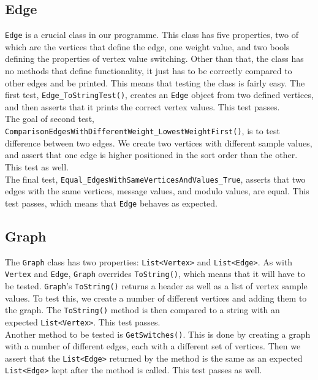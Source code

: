 \subsection*{Edge}
\lstinline|Edge| is a crucial class in our programme.
This class has five properties, two of which are the vertices that define the edge, one weight value, and two bools defining the properties of vertex value switching.
Other than that, the class has no methods that define functionality, it just has to be correctly compared to other edges and be printed.
This means that testing the class is fairly easy.
The first test, \lstinline|Edge_ToStringTest()|, creates an \lstinline|Edge| object from two defined vertices, and then asserts that it prints the correct vertex values.
This test passes.\\
The goal of second test, \lstinline|ComparisonEdgesWithDifferentWeight_LowestWeightFirst()|, is to test difference between two edges.
We create two vertices with different sample values, and assert that one edge is higher positioned in the sort order than the other.
This test as well.\\
The final test, \lstinline|Equal_EdgesWithSameVerticesAndValues_True|, asserts that two edges with the same vertices, message values, and modulo values, are equal.
This test passes, which means that \lstinline|Edge| behaves as expected.

\subsection*{Graph}
The \lstinline|Graph| class has two properties: \lstinline|List<Vertex>| and \lstinline|List<Edge>|.
As with \lstinline|Vertex| and \lstinline|Edge|, \lstinline|Graph| overrides \lstinline|ToString()|, which means that it will have to be tested.
\lstinline|Graph|'s \lstinline|ToString()| returns a header as well as a list of vertex sample values.
To test this, we create a number of different vertices and adding them to the graph.
The \lstinline|ToString()| method is then compared to a string with an expected \lstinline|List<Vertex>|.
This test passes.\\
Another method to be tested is \lstinline|GetSwitches()|.
This is done by creating a graph with a number of different edges, each with a different set of vertices.
Then we assert that the \lstinline|List<Edge>| returned by the method is the same as an expected \lstinline|List<Edge>| kept after the method is called.
This test passes as well.

